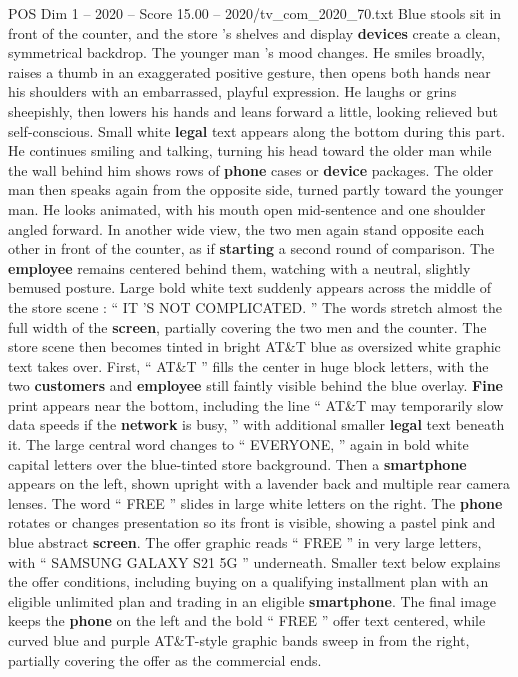 \begin{textsample}{POS Dim 1 – 2020 – Score 15.00 – 2020/tv\_com\_2020\_70.txt}
Blue stools sit in front of the counter, and the store ’s shelves and display \textbf{devices} create a clean, symmetrical backdrop.
The younger man ’s mood changes.
He smiles broadly, raises a thumb in an exaggerated positive gesture, then opens both hands near his shoulders with an embarrassed, playful expression.
He laughs or grins sheepishly, then lowers his hands and leans forward a little, looking relieved but self-conscious.
Small white \textbf{legal} text appears along the bottom during this part.
He continues smiling and talking, turning his head toward the older man while the wall behind him shows rows of \textbf{phone} cases or \textbf{device} packages.
The older man then speaks again from the opposite side, turned partly toward the younger man.
He looks animated, with his mouth open mid-sentence and one shoulder angled forward.
In another wide view, the two men again stand opposite each other in front of the counter, as if \textbf{starting} a second round of comparison.
The \textbf{employee} remains centered behind them, watching with a neutral, slightly bemused posture.
Large bold white text suddenly appears across the middle of the store scene : “ IT ’S NOT COMPLICATED. ” The words stretch almost the full width of the \textbf{screen}, partially covering the two men and the counter.
The store scene then becomes tinted in bright AT\&T blue as oversized white graphic text takes over.
First, “ AT\&T ” fills the center in huge block letters, with the two \textbf{customers} and \textbf{employee} still faintly visible behind the blue overlay. \textbf{Fine} print appears near the bottom, including the line “ AT\&T may temporarily slow data speeds if the \textbf{network} is busy, ” with additional smaller \textbf{legal} text beneath it.
The large central word changes to “ EVERYONE, ” again in bold white capital letters over the blue-tinted store background.
Then a \textbf{smartphone} appears on the left, shown upright with a lavender back and multiple rear camera lenses.
The word “ FREE ” slides in large white letters on the right.
The \textbf{phone} rotates or changes presentation so its front is visible, showing a pastel pink and blue abstract \textbf{screen}.
The offer graphic reads “ FREE ” in very large letters, with “ SAMSUNG GALAXY S21 5G ” underneath.
Smaller text below explains the offer conditions, including buying on a qualifying installment plan with an eligible unlimited plan and trading in an eligible \textbf{smartphone}.
The final image keeps the \textbf{phone} on the left and the bold “ FREE ” offer text centered, while curved blue and purple AT\&T-style graphic bands sweep in from the right, partially covering the offer as the commercial ends.

\end{textsample}
